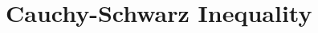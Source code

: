 \documentclass{subfile}
\begin{document}
	\section{Cauchy-Schwarz Inequality}\label{sec:cs}
\end{document}
